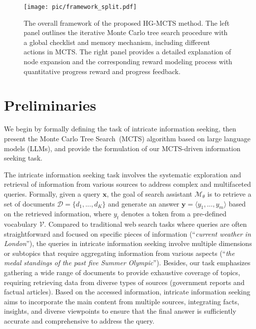 \begin{figure*}[t]
    \centering
    \texttt{[image: pic/framework\_split.pdf]}
    \caption{The overall framework of the proposed HG-MCTS method. The left panel outlines the iterative Monte Carlo tree search procedure with a global checklist and memory mechanism, including different actions in MCTS. The right panel provides a detailed explanation of node expansion and the corresponding reward modeling process with quantitative progress reward and progress feedback.}
    \label{fig:framework}
\end{figure*}

\section{Preliminaries}

We begin by formally defining the task of intricate information seeking, then present the Monte Carlo Tree Search~(MCTS) algorithm based on large language models (LLMs), and provide the formulation of our MCTS-driven information seeking task.



 The intricate information seeking task involves the systematic exploration and retrieval of information from various sources to address complex and multifaceted queries. Formally, given a query $\bm{x}$, the goal of search assistant $\mathcal{M}_\theta$ is to retrieve a set of documents $\mathcal{D}=\{d_1,...,d_K\}$ and generate an answer $\bm{y} = \langle y_1,...,y_m \rangle$ based on the retrieved information, where $y_t$ denotes a token from a pre-defined vocabulary $\mathcal{V}$. Compared to traditional web search tasks where queries are often straightforward and focused on specific pieces of information (\eg ``\emph{current weather in London}''), the queries in intricate information seeking involve multiple dimensions or subtopics that require aggregating information from various aspects (\eg ``\emph{the medal standings of the past five Summer Olympic}''). Besides, our task emphasizes gathering a wide range of documents to provide exhaustive coverage of topics, requiring retrieving data from diverse types of sources (\eg government reports and factual articles). Based on the accessed information, intricate information seeking aims to incorporate the main content from multiple sources, integrating facts, insights, and diverse viewpoints to ensure that the final answer is sufficiently accurate and comprehensive to address the query.

